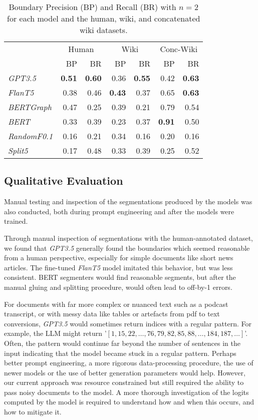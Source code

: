 \begin{table}[ht]
    \centering
    \begin{tabular}{@{}lrrrrrr@{}}
    \toprule
    & \multicolumn{2}{c}{Human} & \multicolumn{2}{c}{Wiki} & \multicolumn{2}{c}{Conc-Wiki} \\
    & BP & BR & BP & BR & BP & BR \\
    \midrule
    \it GPT3.5 & \bf 0.51 & \bf 0.60 & 0.36 & \bf 0.55 & 0.42 & \bf 0.63 \\
    \it FlanT5 & 0.38 & 0.46 & \bf 0.43 & 0.37 & 0.65 & \bf 0.63 \\
    \midrule
    \it BERTGraph & 0.47 & 0.25 & 0.39 & 0.21 & 0.79 & 0.54 \\
    \it BERT & 0.33 & 0.39 & 0.23 & 0.37 & \bf 0.91 & 0.50 \\
    \it RandomF0.1 & 0.16 & 0.21 & 0.34 & 0.16 & 0.20 & 0.16 \\
    \it Split5 & 0.17 & 0.48 & 0.33 & 0.39 & 0.25 & 0.52 \\
    \bottomrule
    \end{tabular}
    \caption{Boundary Precision (BP) and Recall (BR) with $n=2$ for each model and the human, wiki, and concatenated wiki datasets.}\label{tab:quant_results_precision_recall}
   
\end{table}
    

\subsection{Qualitative Evaluation}

Manual testing and inspection of the segmentations produced by the models was also conducted, both during prompt engineering and after the models were trained.

Through manual inspection of segmentations with the human-annotated dataset, we found that \emph{GPT3.5} generally found the boundaries which seemed reasonable from a human perspective, especially for simple documents like short news articles. The fine-tuned \emph{FlanT5} model imitated this behavior, but was less consistent. BERT segmenters would find reasonable segments, but after the manual gluing and splitting procedure, would often lead to off-by-1 errors.

For documents with far more complex or nuanced text such as a podcast transcript, or with messy data like tables or artefacts from pdf to text conversions, \emph{GPT3.5} would sometimes return indices with a regular pattern. For example, the LLM might return '$[1,15,22, \ldots, 76, 79, 82, 85, 88, \ldots, 184, 187, \ldots]$'. Often, the pattern would continue far beyond the number of sentences in the input indicating that the model became stuck in a regular pattern. Perhaps better prompt engineering, a more rigorous data-processing procedure, the use of newer models or the use of better generation parameters would help. However, our current approach was resource constrained but still required the ability to pass noisy documents to the model. A more thorough investigation of the logits computed by the model is required to understand how and when this occurs, and how to mitigate it.